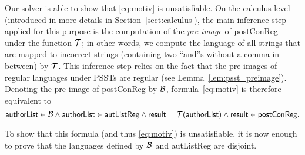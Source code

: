 Our solver is able to show that \eqref{eq:motiv} is unsatisfiable. On
the calculus level (introduced in more details in
Section~\ref{sect:calculus}), the main inference step applied for this
purpose is the computation of the \emph{pre-image} of {\sf postConReg}
under the function
$\mathcal{T}$; in other words, we compute the language of all strings that are
mapped to incorrect strings (containing two ``\textsf{and}''s without
a comma in between) by
$\mathcal{T}$. This inference step relies on the fact that the pre-images of
regular languages under PSSTs are regular (see
Lemma~\ref{lem:psst_preimage}). Denoting the pre-image of {\sf
  postConReg}  by
$\mathcal{B}$, formula~\eqref{eq:motiv} is therefore equivalent to
\begin{equation}
  \label{eq:motiv2}
  {\sf authorList} \in \mathcal{B} \wedge
{\sf authorList} \in {\sf autListReg}\wedge {\sf result} = \mathcal{T}({\sf authorList}) \wedge {\sf result} \in {\sf postConReg}.
\end{equation}

To show that this formula (and thus \eqref{eq:motiv}) is
unsatisfiable, it is now enough to prove that the languages defined by
$\mathcal{B}$ and {\sf autListReg} are disjoint.

%
